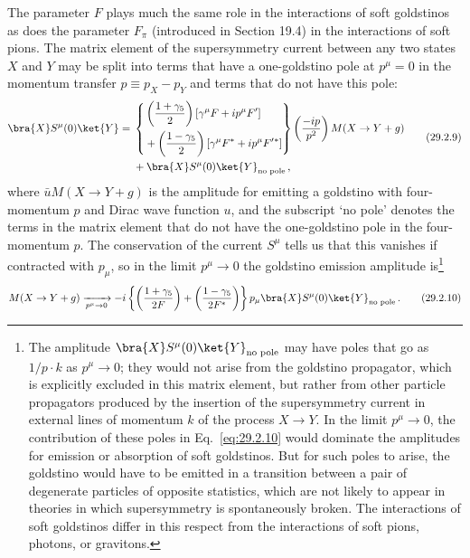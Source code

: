The parameter \(F\) plays much the same role in the interactions of soft
goldstinos as does the parameter \(F_\pi\) (introduced in Section 19.4) in
the interactions of soft pions. The matrix element of the supersymmetry
current between any two states \(X\) and \(Y\) may be split into terms
that have a one-goldstino pole at \(p^\mu=0\) in the momentum transfer
\(p\equiv p_X-p_Y\) and terms that do not have this pole:
\begin{equation}
  \begin{aligned}
  \bra{X} S^\mu(0)\ket{Y}
  ={}&
  \left\{
  \begin{aligned}
    &\left(\frac{1+\gamma_5}{2}\right)
      \left[\gamma^\mu F+ip^\mu F'\right]
    \\
    &+\left(\frac{1-\gamma_5}{2}\right)
      \left[\gamma^\mu F^*+ip^\mu F'{}^*\right]
  \end{aligned}
  \right\}
  \left(\frac{-i\sl{p}}{p^2}\right)
  M(X\to Y+g)
  \\
  &+\bra{X} S^\mu(0)\ket{Y}_{\text{no pole}}\,,
  \end{aligned}
  \tag{29.2.9}\label{eq:29.2.9}
\end{equation}
where \(\bar uM(X\to Y+g)\) is the amplitude for emitting a goldstino with
four-momentum \(p\) and Dirac wave function \(u\), and the subscript
`no pole' denotes the terms in the matrix element that do not have the
one-goldstino pole in the four-momentum \(p\). The conservation of the
current \(S^\mu\) tells us that this vanishes if contracted with \(p_\mu\),
so in the limit \(p^\mu\to0\) the goldstino emission amplitude
is\footnote{The amplitude
\(\bra{X} S^\mu(0)\ket{Y}_{\text{no pole}}\) may have
poles that go as \(1/p\mathbin{\cdot}k\) as \(p^\mu\to0\); they would not
arise from the goldstino propagator, which is explicitly excluded in this
matrix element, but rather from other particle propagators produced by the
insertion of the supersymmetry current in external lines of momentum \(k\)
of the process \(X\to Y\). In the limit \(p^\mu\to0\), the contribution
of these poles in Eq.~\eqref{eq:29.2.10} would dominate the amplitudes for
emission or absorption of soft goldstinos. But for such poles to arise,
the goldstino would have to be emitted in a transition between a pair of
degenerate particles of opposite statistics, which are not likely to
appear in theories in which supersymmetry is spontaneously broken. The
interactions of soft goldstinos differ in this respect from the
interactions of soft pions, photons, or gravitons.}
\begin{equation}
  M(X\to Y+g)
  \xrightarrow[p^\mu\to0]{}
  -i\left\{
    \left(\frac{1+\gamma_5}{2F}\right)
    +\left(\frac{1-\gamma_5}{2F^*}\right)
  \right\}
  p_\mu\bra{X} S^\mu(0)\ket{Y}_{\text{no pole}}\,.
  \tag{29.2.10}\label{eq:29.2.10}
\end{equation}

